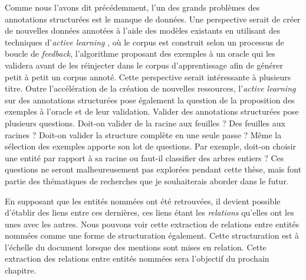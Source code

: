 \documentclass[PhD-Yoann-Dupont.tex]{subfiles}
\begin{document}
Comme nous l'avons dit précédemment, l'un des grands problèmes des annotations structurées est le manque de données. Une perspective serait de créer de nouvelles données annotées à l'aide des modèles existants en utilisant des techniques d'\emph{active learning} \citep{angluin1987learning,mackay1992information}, où le corpus est construit selon un processus de boucle de \textit{feedback}, l'algorithme proposant des exemples à un oracle qui les validera avant de les réinjecter dans le corpus d'apprentissage afin de générer petit à petit un corpus annoté. Cette perspective serait intéressante à plusieurs titre. Outre l'accélération de la création de nouvelles ressources, l'\emph{active learning} sur des annotations structurées pose également la question de la proposition des exemples à l'oracle et de leur validation. Valider des annotations structurées pose plusieurs questions. Doit-on valider de la racine aux feuilles ? Des feuilles aux racines ? Doit-on valider la structure complète en une seule passe ? Même la sélection des exemples apporte son lot de questions. Par exemple, doit-on choisir une entité par rapport à sa racine ou faut-il classifier des arbres entiers ? Ces questions ne seront malheureusement pas explorées pendant cette thèse, mais font partie des thématiques de recherches que je souhaiterais aborder dans le futur.

En supposant que les entités nommées ont été retrouvées, il devient possible d'établir des liens entre ces dernières, ces liens étant les \emph{relations} qu'elles ont les unes avec les autres. Nous pouvons voir cette extraction de relations entre entités nommées comme une forme de structuration également. Cette structuration est à l'échelle du document lorsque des mentions sont mises en relation. Cette extraction des relations entre entités nommées sera l'objectif du prochain chapitre.
\end{document}
